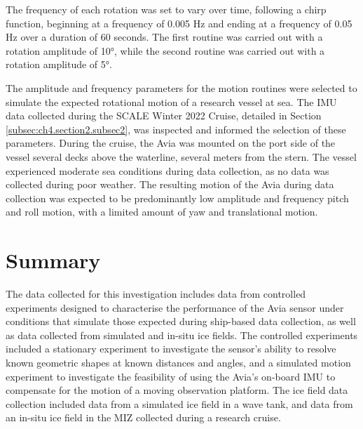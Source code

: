 The frequency of each rotation was set to vary over time, following a chirp function, beginning at a frequency of 0.005 Hz and ending at a frequency of 0.05 Hz over a duration of 60 seconds. The first routine was carried out with a rotation amplitude of 10°, while the second routine was carried out with a rotation amplitude of 5°.

The amplitude and frequency parameters for the motion routines were selected to simulate the expected rotational motion of a research vessel at sea. The \ac{IMU} data collected during the \ac{SCALE} Winter 2022 Cruise, detailed in Section \ref{subsec:ch4.section2.subsec2}, was inspected and informed the selection of these parameters. During the cruise, the Avia was mounted on the port side of the vessel several decks above the waterline, several meters from the stern. The vessel experienced moderate sea conditions during data collection, as no data was collected during poor weather. The resulting motion of the Avia during data collection was expected to be predominantly low amplitude and frequency pitch and roll motion, with a limited amount of yaw and translational motion.

\section{Summary}
\label{sec:ch4.section4}

The data collected for this investigation includes data from controlled experiments designed to characterise the performance of the Avia sensor under conditions that simulate those expected during ship-based data collection, as well as data collected from simulated and in-situ ice fields. The controlled experiments included a stationary experiment to investigate the sensor's ability to resolve known geometric shapes at known distances and angles, and a simulated motion experiment to investigate the feasibility of using the Avia's on-board \ac{IMU} to compensate for the motion of a moving observation platform. The ice field data collection included data from a simulated ice field in a wave tank, and data from an in-situ ice field in the \ac{MIZ} collected during a research cruise.

